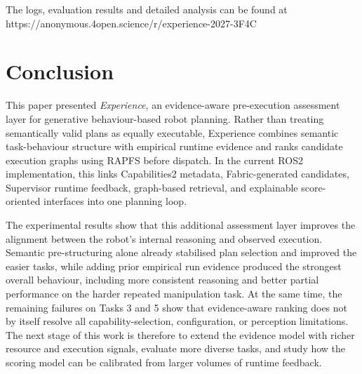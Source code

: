 \documentclass[letterpaper, 10pt, conference]{ieeeconf}
\begin{document}
The logs, evaluation results and detailed analysis can be found at https://anonymous.4open.science/r/experience-2027-3F4C

\section{Conclusion}

This paper presented \textit{Experience}, an evidence-aware pre-execution assessment layer for generative behaviour-based robot planning. Rather than treating semantically valid plans as equally executable, Experience combines semantic task-behaviour structure with empirical runtime evidence and ranks candidate execution graphs using RAPFS before dispatch. In the current ROS2 implementation, this links Capabilities2 metadata, Fabric-generated candidates, Supervisor runtime feedback, graph-based retrieval, and explainable score-oriented interfaces into one planning loop.

The experimental results show that this additional assessment layer improves the alignment between the robot's internal reasoning and observed execution. Semantic pre-structuring alone already stabilised plan selection and improved the easier tasks, while adding prior empirical run evidence produced the strongest overall behaviour, including more consistent reasoning and better partial performance on the harder repeated manipulation task. At the same time, the remaining failures on Tasks 3 and 5 show that evidence-aware ranking does not by itself resolve all capability-selection, configuration, or perception limitations. The next stage of this work is therefore to extend the evidence model with richer resource and execution signals, evaluate more diverse tasks, and study how the scoring model can be calibrated from larger volumes of runtime feedback.



\end{document}

